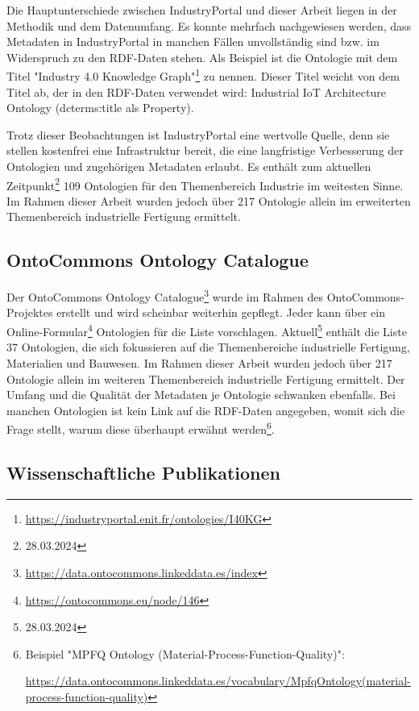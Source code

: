 \documentclass{article}
\begin{document}
Die Hauptunterschiede zwischen IndustryPortal und dieser Arbeit liegen in der Methodik und dem Datenumfang.
Es konnte mehrfach nachgewiesen werden, dass Metadaten in IndustryPortal in manchen Fällen unvollständig sind bzw. im Widerspruch zu den RDF-Daten stehen.
Als Beispiel ist die Ontologie mit dem Titel "Industry 4.0 Knowledge Graph"\footnote{\url{https://industryportal.enit.fr/ontologies/I40KG}} zu nennen.
Dieser Titel weicht von dem Titel ab, der in den RDF-Daten verwendet wird: Industrial IoT Architecture Ontology (dcterms:title als Property).

Trotz dieser Beobachtungen ist IndustryPortal eine wertvolle Quelle, denn sie stellen kostenfrei eine Infrastruktur bereit, die eine langfristige Verbesserung der Ontologien und zugehörigen Metadaten erlaubt.
Es enthält zum aktuellen Zeitpunkt\footnote{28.03.2024} 109 Ontologien für den Themenbereich Industrie im weitesten Sinne.
Im Rahmen dieser Arbeit wurden jedoch über 217 Ontologie allein im erweiterten Themenbereich industrielle Fertigung ermittelt.

\subsection{OntoCommons Ontology Catalogue}

Der OntoCommons Ontology Catalogue\footnote{\url{https://data.ontocommons.linkeddata.es/index}} wurde im Rahmen des OntoCommons-Projektes erstellt und wird scheinbar weiterhin gepflegt.
Jeder kann über ein Online-Formular\footnote{\url{https://ontocommons.eu/node/146}} Ontologien für die Liste vorschlagen.
Aktuell\footnote{28.03.2024} enthält die Liste 37 Ontologien, die sich fokussieren auf die Themenbereiche industrielle Fertigung, Materialien und Bauwesen.
Im Rahmen dieser Arbeit wurden jedoch über 217 Ontologie allein im weiteren Themenbereich industrielle Fertigung ermittelt.
Der Umfang und die Qualität der Metadaten je Ontologie schwanken ebenfalls.
Bei manchen Ontologien ist kein Link auf die RDF-Daten angegeben, womit sich die Frage stellt, warum diese überhaupt erwähnt werden\footnote{Beispiel "MPFQ Ontology (Material-Process-Function-Quality)":

\url{https://data.ontocommons.linkeddata.es/vocabulary/MpfqOntology(material-process-function-quality)}}.

\subsection{Wissenschaftliche Publikationen}
\end{document}
